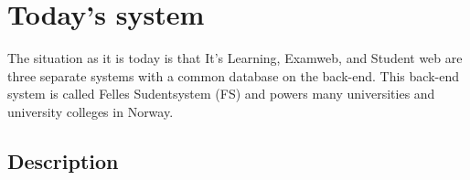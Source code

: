 \chapter{Today's system}

The situation as it is today is that It's Learning, Examweb, and Student web are three separate systems with a common database on the back-end. 
This back-end system is called Felles Sudentsystem (FS) and powers many universities and university colleges in Norway.

\section{Description}






\newpage
